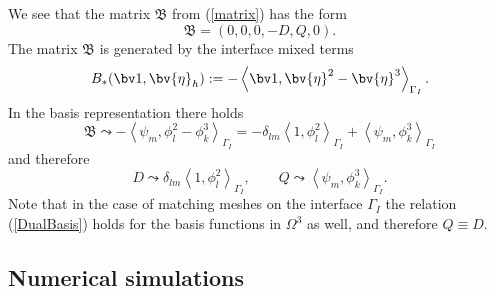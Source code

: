 We see that the matrix $\mathfrak B$ from (\ref{matrix}) has the form
\[
\mathfrak B = (0, 0, 0, -D, Q, 0).
\]
The matrix $\mathfrak B$ is generated by the interface mixed terms 
\[
B_*(\bv 1, \bv{\eta}_h) 
:= - \left\langle \bv 1, \bv{\eta}^2 - \bv{\eta}^3 \right\rangle_{\Gamma_I}.
\]
In the basis representation there holds
\begin{equation}
\mathfrak B \leadsto 
- \left\langle \psi_m, \phi^2_l - \phi^3_k \right\rangle_{\Gamma_I} 
= - \delta_{lm} \left\langle 1,  \phi^2_l \right\rangle_{\Gamma_I}
+ \left\langle \psi_m,  \phi^3_k \right\rangle_{\Gamma_I}
\end{equation}
and therefore
\begin{equation}
D \leadsto \delta_{lm} \left\langle 1,  \phi^2_l \right\rangle_{\Gamma_I},
\qquad
Q \leadsto \left\langle \psi_m,  \phi^3_k \right\rangle_{\Gamma_I}.
\end{equation}
Note that in the case of matching meshes on the interface $\Gamma_I$ the relation (\ref{DualBasis}) holds for the basis functions in $\Omega^3$ as well, and therefore $Q \equiv D$.

\subsection{Numerical simulations}\label{sec:DomainDecomposition:Benchmarks}

